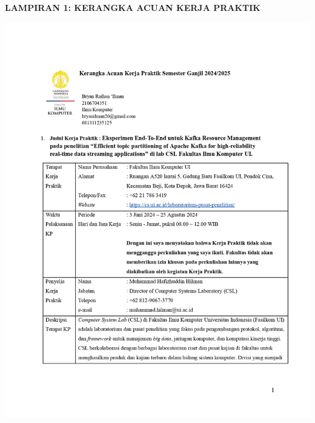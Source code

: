 \begin{center}
    \textbf{\large LAMPIRAN 1: KERANGKA ACUAN KERJA PRAKTIK}
\end{center}
\label{appendix:lampiran-1}

\includegraphics[width=1\textwidth]{assets/pics/KAKP_Bryan Raihan Ilman_2106704351_signed_page-0001.jpg}

